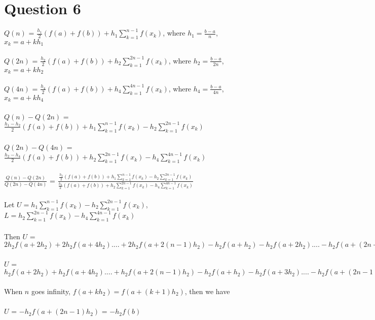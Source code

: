 \documentclass[11pt]{article} %
\begin{document}
\section{Question 6}
$Q(n)$ = $\frac{h_{1}}{2}(f(a)+f(b))+h_{1}\sum_{k=1}^{n-1}f(x_{k})$, where $h_{1} = \frac{b-a}{n}$, $x_{k} = a+kh_{1}$\\\\
$Q(2n)$ = $\frac{h_{2}}{2}(f(a)+f(b))+h_{2}\sum_{k=1}^{2n-1}f(x_{k})$, where $h_{2} = \frac{b-a}{2n}$, $x_{k} = a+kh_{2}$\\\\
$Q(4n)$ = $\frac{h_{4}}{2}(f(a)+f(b))+h_{4}\sum_{k=1}^{4n-1}f(x_{k})$, where $h_{4} = \frac{b-a}{4n}$, $x_{k} = a+kh_{4}$\\\\
$Q(n) - Q(2n)$ = $\frac{h_{1}-h_{2}}{2}(f(a)+f(b))+h_{1}\sum_{k=1}^{n-1}f(x_{k})-h_{2}\sum_{k=1}^{2n-1}f(x_{k})$\\\\
$Q(2n) - Q(4n)$ = $\frac{h_{2}-h_{4}}{2}(f(a)+f(b))+h_{2}\sum_{k=1}^{2   n-1}f(x_{k})-h_{4}\sum_{k=1}^{4n-1}f(x_{k})$\\\\
$\frac{Q(n) - Q(2n)}{Q(2n) - Q(4n)}$ = $\frac{\frac{h_{2}}{2}(f(a)+f(b))+h_{1}\sum_{k=1}^{n-1}f(x_{k})-h_{2}\sum_{k=1}^{2n-1}f(x_{k})}{\frac{h_{4}}{2}(f(a)+f(b))+h_{2}\sum_{k=1}^{2   n-1}f(x_{k})-h_{4}\sum_{k=1}^{4n-1}f(x_{k})}$\\\\
Let $U = h_{1}\sum_{k=1}^{n-1}f(x_{k})-h_{2}\sum_{k=1}^{2n-1}f(x_{k})$,
$L = h_{2}\sum_{k=1}^{2   n-1}f(x_{k})-h_{4}\sum_{k=1}^{4n-1}f(x_{k})$\\\\
Then $U$ = $2h_{2}f(a+2h_{2})+2h_{2}f(a+4h_{2})....+2h_{2}f(a+2(n-1)h_{2}) - h_{2}f(a+h_{2})-h_{2}f(a+2h_{2})....-h_{2}f(a+(2n-1)h_{2})$\\\\
$U$ = $h_{2}f(a+2h_{2})+h_{2}f(a+4h_{2})....+h_{2}f(a+2(n-1)h_{2}) - h_{2}f(a+h_{2})-h_{2}f(a+3h_{2})....-h_{2}f(a+(2n-1)h_{2})$\\\\
When $n$ goes infinity, $f(a+kh_2) =f(a+(k+1)h_2)$, then we have\\\\
$U$ = $-h_{2}f(a+(2n-1)h_{2})$ = $-h_2f(b)$
\end{document}
